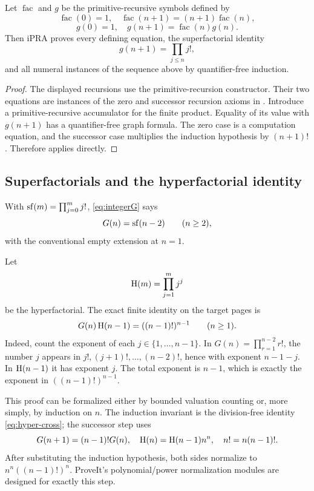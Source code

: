 \begin{theorem}\label{thm:integer-ipra}
Let \(\operatorname{fac}\) and \(g\) be the primitive-recursive symbols defined
by
\[
 \operatorname{fac}(0)=1,
 \quad \operatorname{fac}(n+1)=(n+1)\operatorname{fac}(n),
\]
\[
 g(0)=1,
 \quad g(n+1)=\operatorname{fac}(n)g(n).
\]
Then iPRA proves every defining equation, the superfactorial identity
\[
 g(n+1)=\prod_{j\le n}j!,
\]
and all numeral instances of the sequence above by quantifier-free induction.
\end{theorem}

\begin{proof}
The displayed recursions use the primitive-recursion constructor.  Their two
equations are instances of the zero and successor recursion axioms in
.  Introduce a primitive-recursive accumulator for the finite
product.  Equality of its value
with \(g(n+1)\) has a quantifier-free graph formula.  The zero case is a
computation equation, and the successor case multiplies the induction
hypothesis by \((n+1)!\).  Therefore  applies directly.
\end{proof}

\subsection{Superfactorials and the hyperfactorial identity}

With \(\operatorname{sf}(m)=\prod_{j=0}^{m}j!\), \cref{eq:integerG} says
\begin{equation}\label{eq:superfactorial}
 G(n)=\operatorname{sf}(n-2)\qquad(n\ge2),
\end{equation}
with the conventional empty extension at \(n=1\).

Let
\[
 \operatorname{H}(m)=\prod_{j=1}^{m}j^j
\]
be the hyperfactorial.  The exact finite identity on the target pages is
\begin{equation}\label{eq:hyper-cross}
 G(n)\operatorname{H}(n-1)=((n-1)!)^{n-1}\qquad(n\ge1).
\end{equation}
Indeed, count the exponent of each \(j\in\{1,\ldots,n-1\}\).  In
\(G(n)=\prod_{r=1}^{n-2}r!\), the number \(j\) appears in
\(j!, (j+1)!,\ldots,(n-2)!\), hence with exponent \(n-1-j\).  In
\(\operatorname{H}(n-1)\) it has exponent \(j\).  The total exponent is \(n-1\), which is
exactly the exponent in \(((n-1)!)^{n-1}\).

This proof can be formalized either by bounded valuation counting or, more
simply, by induction on \(n\).  The induction invariant is the division-free
identity \cref{eq:hyper-cross}; the successor step uses
\[
 G(n+1)=(n-1)!G(n),
 \quad
 \operatorname{H}(n)=\operatorname{H}(n-1)n^n,
 \quad
 n!=n(n-1)!.
\]
After substituting the induction hypothesis, both sides normalize to
\(n^n((n-1)!)^n\).  ProveIt's polynomial/power normalization modules are
designed for exactly this step.

